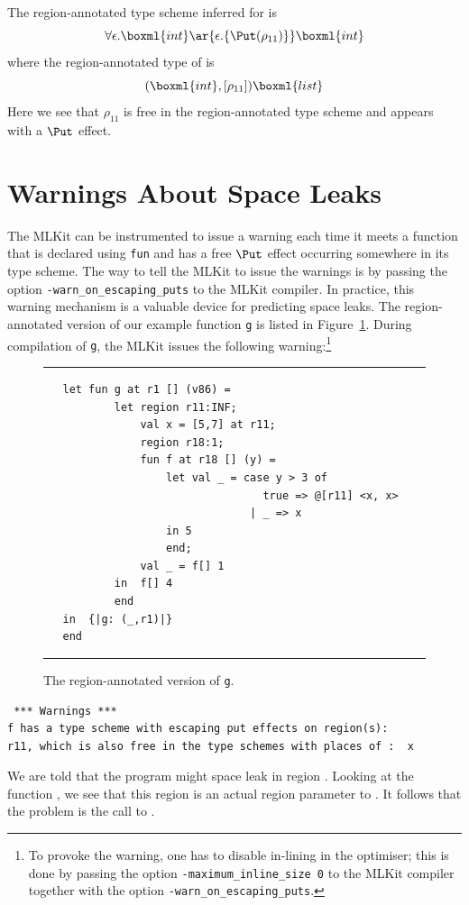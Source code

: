 \documentclass[12pt]{book}
\begin{document}
The region-annotated type scheme inferred for  is
$$\forall\epsilon.\boxml{int} \ar{\epsilon.\{\Put(\rho_{11})\}} \boxml{int}$$
where the region-annotated type of  is
$$(\boxml{int},[\rho_{11}])\boxml{list}$$
Here we see that
$\rho_{11}$ is free in the region-annotated type scheme and appears
with a $\Put$ effect.

\section{Warnings About Space Leaks}
The MLKit can be instrumented to issue a warning each time it meets a
function that is declared using {\tt fun} and has a free $\Put$ effect
occurring somewhere in its type scheme. The way to tell the MLKit to
issue the warnings is by passing the option
%
\texttt{-warn\_on\_escaping\_puts} to the MLKit compiler. In practice, this warning
mechanism is a valuable device for predicting space leaks.  The
region-annotated version of our example function {\tt g} is listed in
Figure~\ref{escape_mulexp.fig}. During compilation of {\tt g}, the MLKit
issues the following warning:\footnote{To provoke the warning, one has
  to disable in-lining in the
  {\Lam} optimiser; this is done by passing the option
  \texttt{-maximum\_inline\_size 0} to the MLKit compiler together
  with the option \texttt{-warn\_on\_escaping\_puts}.}
\begin{figure}
\hrule
\medskip
\begin{verbatim}
   let fun g at r1 [] (v86) =
           let region r11:INF;
               val x = [5,7] at r11;
               region r18:1;
               fun f at r18 [] (y) =
                   let val _ = case y > 3 of
                                  true => @[r11] <x, x>
                                | _ => x
                   in 5
                   end;
               val _ = f[] 1
           in  f[] 4
           end
   in  {|g: (_,r1)|}
   end
\end{verbatim}
\caption{The region-annotated version of {\tt g}.}
\medskip
\hrule
\label{escape_mulexp.fig}
\end{figure}
\begin{small}
\begin{verbatim}
 *** Warnings ***
f has a type scheme with escaping put effects on region(s):
r11, which is also free in the type schemes with places of :  x
\end{verbatim}
\end{small}
We are told that the program might space leak in region .
Looking at the function , we see that this region is an
actual region parameter to . It follows that the problem is
the call to .
\end{document}
